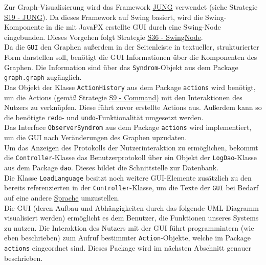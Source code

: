\documentclass[enabledeprecatedfontcommands,fontsize=11pt,paper=a4,twoside]{scrartcl}
\newcounter{one}
\begin{document}
Zur Graph-Visualisierung wird das Framework \hyperlink{eee}{JUNG} verwendet (siehe Strategie \hyperlink{eee}{S19 - JUNG}). Da dieses Framework auf Swing basiert, wird die Swing-Komponente in die mit JavaFX erstellte GUI durch eine Swing-Node eingebunden. Dieses Vorgehen folgt Strategie \hyperlink{lll}{S36 - SwingNode}.\\

Da die \texttt{GUI} den Graphen außerdem in der Seitenleiste in textueller, strukturierter Form darstellen soll, benötigt die GUI Informationen über die Komponenten des Graphen. Die Information sind über das \texttt{Syndrom}-Objekt aus dem Package \texttt{graph.graph} zugänglich. \\

Das Objekt der Klasse \texttt{ActionHistory} aus dem Package \texttt{actions} wird benötigt, um die Actions (gemäß Strategie \hyperlink{command}{S9 - Command}) mit den Interaktionen des Nutzers zu verknüpfen. Diese führt zuvor erstellte Actions aus. Außerdem kann so die benötigte \texttt{redo}- und \texttt{undo}-Funktionalität umgesetzt werden. \\

Das Interface \texttt{ObserverSyndrom} aus dem Package \texttt{actions} wird implementiert, um die GUI nach Veränderungen des Graphen upzudaten.\\

Um das Anzeigen des Protokolls der Nutzerinteraktion zu ermöglichen, bekommt die \texttt{Controller}-Klasse das Benutzerprotokoll über ein Objekt der \texttt{LogDao}-Klasse aus dem Package \texttt{dao}. Dieses bildet die Schnittstelle zur Datenbank. \\

Die Klasse \texttt{LoadLanguage} besitzt noch weitere GUI-Elemente zusätzlich zu den bereits referenzierten in der \texttt{Controller}-Klasse, um die Texte der \texttt{GUI} bei Bedarf auf eine andere \hyperlink{hh}{Sprache} umzustellen. \\
	
Die GUI (deren Aufbau und Abhängigkeiten durch das folgende UML-Diagramm visualisiert werden) ermöglicht es dem Benutzer, die Funktionen unseres Systems zu nutzen. Die Interaktion des Nutzers mit der GUI führt programmintern (wie eben beschrieben) zum Aufruf bestimmter \texttt{Action}-Objekte, welche im Package \texttt{actions} eingeordnet sind. Dieses Package wird im nächsten Abschnitt genauer beschrieben.


\newpage

\end{document}
